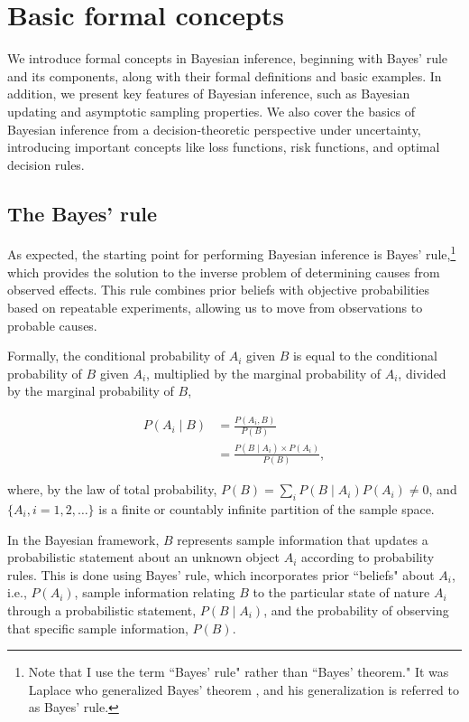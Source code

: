 \chapter{Basic formal concepts}\label{chap1}

We introduce formal concepts in Bayesian inference, beginning with Bayes' rule and its components, along with their formal definitions and basic examples. In addition, we present key features of Bayesian inference, such as Bayesian updating and asymptotic sampling properties. We also cover the basics of Bayesian inference from a decision-theoretic perspective under uncertainty, introducing important concepts like loss functions, risk functions, and optimal decision rules.

\section{The Bayes' rule}\label{sec11}
As expected, the starting point for performing Bayesian inference is Bayes' rule,\footnote{Note that I use the term ``Bayes' rule" rather than ``Bayes' theorem." It was Laplace \cite{laplace1774memoire} who generalized Bayes' theorem \cite{bayes1763lii}, and his generalization is referred to as Bayes' rule.} which provides the solution to the inverse problem of determining causes from observed effects. This rule combines prior beliefs with objective probabilities based on repeatable experiments, allowing us to move from observations to probable causes.

Formally, the conditional probability of \( A_i \) given \( B \) is equal to the conditional probability of \( B \) given \( A_i \), multiplied by the marginal probability of \( A_i \), divided by the marginal probability of \( B \),

\begin{align}
	P(A_i\mid B)&=\frac{P(A_i,B)}{P(B)}\nonumber\\
	&=\frac{P(B \mid A_i) \times P(A_i)}{P(B)},
	\label{eq:111}
\end{align}

where, by the law of total probability, \( P(B) = \sum_i P(B \mid A_i) P(A_i) \neq 0 \), and \( \{ A_i, i = 1, 2, \dots \} \) is a finite or countably infinite partition of the sample space.

In the Bayesian framework, \( B \) represents sample information that updates a probabilistic statement about an unknown object \( A_i \) according to probability rules. This is done using Bayes' rule, which incorporates prior ``beliefs" about \( A_i \), i.e., \( P(A_i) \), sample information relating \( B \) to the particular state of nature \( A_i \) through a probabilistic statement, \( P(B \mid A_i) \), and the probability of observing that specific sample information, \( P(B) \).

